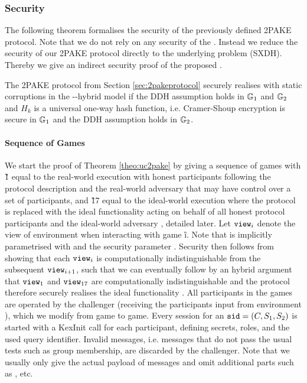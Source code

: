 \subsubsection{Security}\label{sec:2pakeproof}
The following theorem formalises the security of the previously defined 2PAKE protocol.
Note that we do not rely on any security of the \TDSPHF.
Instead we reduce the security of our 2PAKE protocol directly to the underlying problem (SXDH).
Thereby we give an indirect security proof of the proposed \TDSPHF.
 
\begin{theorem}\label{theo:uc2pake}
  The 2PAKE protocol from Section \ref{sec:2pakeprotocol} securely realises \FTWOPAKEM with static corruptions in the \Fcrs-\Fca-hybrid model if the DDH assumption holds in $\mathbb{G}_1$ and $\mathbb{G}_2$ and $H_k$ is a universal one-way hash function, i.e. Cramer-Shoup encryption is secure in $\mathbb{G}_1$ and the DDH assumption holds in $\mathbb{G}_2$.
\end{theorem}

\paragraph{Sequence of Games}
We start the proof of Theorem \ref{theo:uc2pake} by giving a sequence of games with \G{1} equal to the real-world execution with honest participants following the protocol description and the real-world adversary \cA that may have control over a set of participants, and \G{17} equal to the ideal-world execution where the protocol is replaced with the ideal functionality \FDSPHF acting on behalf of all honest protocol participants and the ideal-world adversary \SIM, detailed later.
Let $\mathtt{view}_i$ denote the view of environment \cZ when interacting with game \G{i}.
Note that \view is implicitly parametrised with \sid and the security parameter \secpar.
Security then follows from showing that each $\mathtt{view}_i$ is computationally indistinguishable from the subsequent $\mathtt{view}_{i+1}$, such that we can eventually follow by an hybrid argument that $\mathtt{view}_1$ and $\mathtt{view}_{17}$ are computationally indistinguishable and the protocol therefore securely realises the ideal functionality \FTWOPAKE.
All participants in the games are operated by the challenger \cC (receiving the participants input from environment \cZ), which we modify from game to game.
Every session for an $\mathtt{sid}=(C,S_1,S_2)$ is started with a KexInit call for each participant, defining secrets, roles, and the used query identifier.
Invalid messages, i.e. messages that do not pass the usual tests such as group membership, are discarded by the challenger.
Note that we usually only give the actual payload of messages and omit additional parts such as \sid, \qid etc.

